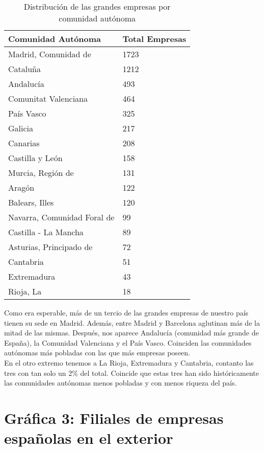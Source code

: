 \documentclass[11pt]{article}
\theoremstyle{plain}
\theoremstyle{definition}
\begin{document}
\begin{table}[H]
  \centering
  \begin{tabular}{|l|l|}
    \hline
    Comunidad Autónoma & Total Empresas \\
    \hline
    Madrid, Comunidad de  & 1723\\
    Cataluña  & 1212\\
    Andalucía & 493\\
    Comunitat Valenciana  & 464\\
    País Vasco  & 325\\
    Galicia & 217\\
    Canarias  & 208\\
    Castilla y León & 158\\
    Murcia, Región de & 131\\
    Aragón  & 122\\
    Balears, Illes  & 120\\
    Navarra, Comunidad Foral de & 99\\
    Castilla - La Mancha  & 89\\
    Asturias, Principado de & 72\\
    Cantabria & 51\\
    Extremadura & 43\\
    Rioja, La & 18\\
    \hline

  \end{tabular}
  \caption{Distribución de las grandes empresas por comunidad
    autónoma}
\end{table}

Como era esperable, más de un tercio de las grandes empresas de
nuestro país tienen su sede en Madrid. Además, entre Madrid y
Barcelona aglutinan más de la mitad de las mismas. Después, nos
aparece Andalucía (comunidad más grande de España), la Comunidad
Valenciana y el País Vasco. Coinciden las comunidades autónomas más
pobladas con las que más empresas poseen.\\

En el otro extremo tenemos a La Rioja, Extremadura y Cantabria,
contanto las tres con tan solo un 2\% del total. Coincide que estas
tres han sido históricamente las comunidades autónomas menos pobladas
y con menos riqueza del país.

\section{Gráfica 3: Filiales de empresas españolas en el exterior}
\end{document}
